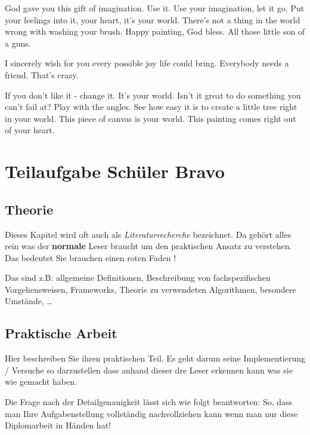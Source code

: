 \documentclass[
    headings=optiontotocandhead,%
    twoside,
    numbers=noenddot,%
    12pt, %
    titlepage, %
    parskip=full, %
    listof=leveldown, 
    numbers=noenddot, %
    a4paper,DIV=14,
    BCOR=15mm,
]{scrbook}
\makeatletter
\newcommand*{\authormark}{}
\newcommand*{\textauthor}[1]{%
   \renewcommand{\authormark}{\translate{author}: #1}%
   \ignorespaces
}
\newcommand*{\the@orig@section}{}
\let\the@orig@section\section
\renewcommand*{\section}{%
  \clearpage
  \the@orig@section
}
\makeatother
\begin{document}
God gave you this gift of imagination. Use it. Use your imagination, let
it go. Put your feelings into it, your heart, it's your world. There's
not a thing in the world wrong with washing your brush. Happy painting,
God bless. All those little son of a guns.

I sincerely wish for you every possible joy life could bring. Everybody
needs a friend. That's crazy.

If you don't like it - change it. It's your world. Isn't it great to do
something you can't fail at? Play with the angles. See how easy it is to
create a little tree right in your world. This piece of canvas is your
world. This painting comes right out of your heart.

\hypertarget{teilaufgabe-schuxfcler-bravo}{%
\section{Teilaufgabe Schüler Bravo}\label{teilaufgabe-schuxfcler-bravo}}

\textauthor{Schueler 2}

\hypertarget{theorie}{%
\subsection{Theorie}\label{theorie}}

Dieses Kapitel wird oft auch als \emph{Literaturrecherche} bezeichnet.
Da gehört alles rein was der \textbf{normale} Leser braucht um den
praktischen Ansatz zu verstehen. Das bedeutet Sie brauchen einen roten
Faden !

Das sind z.B: allgemeine Definitionen, Beschreibung von fachspezifischen
Vorgehensweisen, Frameworks, Theorie zu verwendeten Algorithmen,
besondere Umstände, \ldots{}

\hypertarget{praktische-arbeit-1}{%
\subsection{Praktische Arbeit}\label{praktische-arbeit-1}}

Hier beschreiben Sie ihren praktischen Teil. Es geht darum seine
Implementierung / Versuche so darzustellen dass anhand dieser dre Leser
erkennen kann was sie wie gemacht haben.

Die Frage nach der Detailgenauigkeit lässt sich wie folgt beantworten:
So, dass man Ihre Aufgabenstellung vollständig nachvollziehen kann wenn
man nur diese Diplomarbeit in Händen hat!
\end{document}
